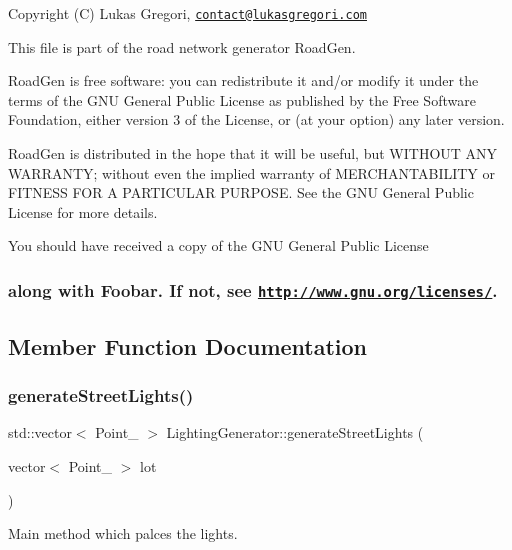  Copyright (C) Lukas Gregori, \href{mailto:contact@lukasgregori.com}{\tt contact@lukasgregori.\+com}

This file is part of the road network generator Road\+Gen.

Road\+Gen is free software\+: you can redistribute it and/or modify it under the terms of the G\+NU General Public License as published by the Free Software Foundation, either version 3 of the License, or (at your option) any later version.

Road\+Gen is distributed in the hope that it will be useful, but W\+I\+T\+H\+O\+UT A\+NY W\+A\+R\+R\+A\+N\+TY; without even the implied warranty of M\+E\+R\+C\+H\+A\+N\+T\+A\+B\+I\+L\+I\+TY or F\+I\+T\+N\+E\+SS F\+OR A P\+A\+R\+T\+I\+C\+U\+L\+AR P\+U\+R\+P\+O\+SE. See the G\+NU General Public License for more details.

You should have received a copy of the G\+NU General Public License \subsubsection*{along with Foobar. If not, see \href{http://www.gnu.org/licenses/}{\tt http\+://www.\+gnu.\+org/licenses/}. }

\subsection{Member Function Documentation}
\hypertarget{class_lighting_generator_aeb4a2896ceab6923c747d0a30ce3543f}{}\label{class_lighting_generator_aeb4a2896ceab6923c747d0a30ce3543f} 
\subsubsection{\texorpdfstring{generate\+Street\+Lights()}{generateStreetLights()}}
{\footnotesize\ttfamily std\+::vector$<$ Point\+\_ $>$ Lighting\+Generator\+::generate\+Street\+Lights (\begin{DoxyParamCaption}\item[{vector$<$ Point\+\_\+2 $>$}]{lot }\end{DoxyParamCaption})\hspace{0.3cm}{\ttfamily [static]}}



Main method which palces the lights. 

